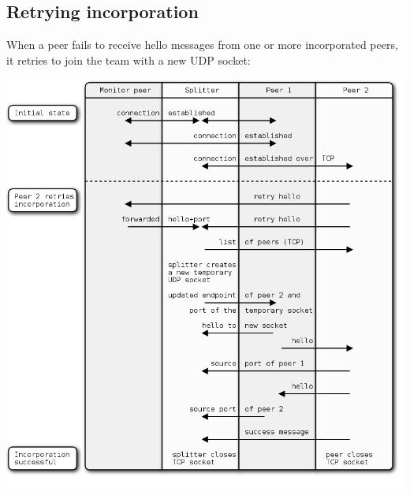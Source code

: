\documentclass{article}
\begin{document}
\subsection{Retrying incorporation}

When a peer fails to receive hello messages from one or more
incorporated peers, it retries to join the team with a new UDP socket:

\begin{center}
\includegraphics{images/retrying_incorporation.png}
\end{center}
\end{document}

